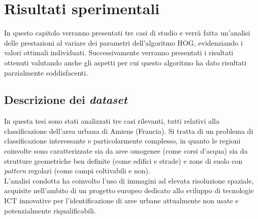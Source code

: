 \chapter{Risultati sperimentali} %

\label{cap:risultati} %


In questo capitolo verranno presentati tre casi di studio e verrà fatta un'analisi delle prestazioni al variare dei parametri dell'algoritmo HOG, evidenziando i valori ottimali individuati. 
Successivamente verranno presentati i risultati ottenuti valutando anche gli aspetti per cui questo algoritmo ha dato risultati parzialmente soddisfacenti.

\clearpage

\section{Descrizione dei \emph{dataset}}
In questa tesi sono stati analizzati tre casi rilevanti, tutti relativi alla classificazione dell'area urbana di Amiens (Francia).  Si tratta di un problema di classificazione interessante e particolarmente complesso, in quanto le regioni coinvolte sono caratterizzate sia da aree omogenee (come corsi d'acqua) sia da strutture geometriche ben definite (come edifici e strade) e zone di suolo con\emph{ pattern} regolari (come campi coltivabili e non).\\
L'analisi condotta ha coinvolto l'uso di immagini ad elevata risoluzione spaziale, acquisite nell'ambito di un progetto europeo dedicato allo sviluppo di tecnologie ICT innovative per l'identificazione di aree urbane attualmente non usate e potenzialmente riqualificabili.\\

